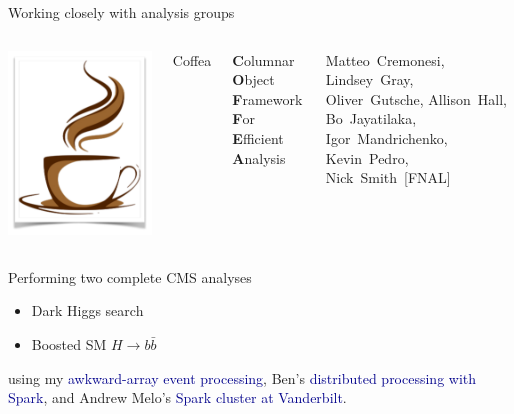 \documentclass[aspectratio=169]{beamer}
\begin{document}
\begin{frame}{Working closely with analysis groups}
\vspace{0.75 cm}
\begin{columns}
\includegraphics[width=\linewidth]{coffea-logo.png}

\hspace{-0.2 cm}\Huge Coffea

\vspace{0.25 cm}
\large {\bf C}olumnar {\bf O}bject {\bf F}ramework {\bf F}or {\bf E}fficient {\bf A}nalysis

\vspace{0.25 cm}
\normalsize Matteo~Cremonesi, Lindsey~Gray, Oliver~Gutsche, Allison~Hall, Bo~Jayatilaka, Igor~Mandrichenko, Kevin~Pedro, Nick~Smith~[FNAL]
\end{columns}

\vspace{0.25 cm}
\begin{center}
\begin{minipage}{0.85\linewidth}
\large Performing two complete CMS analyses
\begin{itemize}
\item Dark Higgs search
\item Boosted SM $H \to b\bar{b}$
\end{itemize}
using my \textcolor{darkblue}{awkward-array event processing}, Ben's \textcolor{darkblue}{distributed processing with Spark}, and Andrew Melo's \textcolor{darkblue}{Spark cluster at Vanderbilt}.
\end{minipage}
\end{center}
\end{frame}
\end{document}

